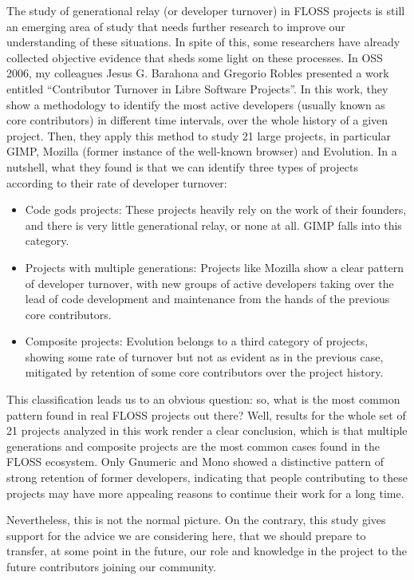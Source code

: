 The study of generational relay (or developer turnover) in FLOSS projects is
still an emerging area of study that needs further research to improve our
understanding of these situations. In spite of this, some researchers have
already collected objective evidence that sheds some light on these processes.
In OSS 2006, my colleagues Jesus G. Barahona and Gregorio Robles presented a
work entitled ``Contributor Turnover in Libre Software Projects''. In this work,
they show a methodology to identify the most active developers (usually known as
core contributors) in different time intervals, over the whole history of a
given  project. Then, they apply this method to study 21 large projects, in
particular GIMP, Mozilla (former instance of the well-known browser) and
Evolution. In a nutshell, what they found is that we can identify three types of
projects according to their rate of developer turnover:
\begin{itemize}
 \item Code gods projects: These projects heavily rely on the work of their
founders, and there is very little generational relay, or none at all. GIMP
falls into this category.
 \item Projects with multiple generations: Projects like Mozilla show a clear
pattern of developer turnover, with new groups of active developers taking over
the lead of code development and maintenance from the hands of the previous core
contributors.
 \item Composite projects: Evolution belongs to a third category of projects,
showing some rate of turnover but not as evident as in the previous case,
mitigated by retention of some core contributors over the project history.
\end{itemize}

This classification leads us to an obvious question: so, what is the most common
pattern found in real FLOSS projects out there? Well, results for the whole set
of 21 projects analyzed in this work render a clear conclusion, which is that
multiple generations and composite projects are the most common cases found in
the FLOSS ecosystem. Only Gnumeric and Mono showed a distinctive pattern of strong retention of former developers, indicating that people contributing to these projects may have more appealing reasons to continue their work for a long time.

Nevertheless, this is not the normal picture. On the contrary, this study gives
support for the advice we are considering here, that we should prepare to
transfer, at some point in the future, our role and knowledge in the project to
the future contributors joining our community.

